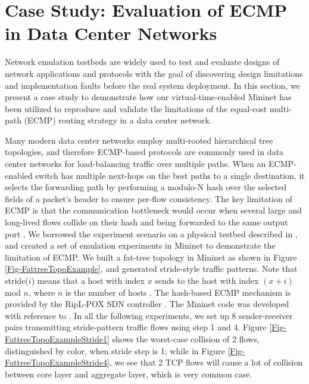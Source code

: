 \section{Case Study: Evaluation of ECMP in Data Center Networks}
\label{Sec-CaseStudy}
Network emulation testbeds are widely used to test and evaluate designs of network applications and protocols with the goal of discovering design limitations and implementation faults before the real system deployment. In this section, we present a case study to demonstrate how our virtual-time-enabled Mininet has been utilized to reproduce and validate the limitations of the equal-cost multi-path (ECMP) routing strategy in a data center network.

Many modern data center networks employ multi-rooted hierarchical tree topologies, and therefore ECMP-based protocols \cite{ECMP} are commonly used in data center networks for load-balancing traffic over multiple paths. When an ECMP-enabled switch has multiple next-hops on the best paths to a single destination, it selects the forwarding path by performing a modulo-N hash over the selected fields of a packet's header to ensure per-flow consistency. The key limitation of ECMP is that the communication bottleneck would occur when several large and long-lived flows collide on their hash and being forwarded to the same output port \cite{Hedera}. 
We borrowed the experiment scenario on a physical testbed described in \cite{Hedera}, and created a set of emulation experiments in Mininet to demonstrate the limitation of ECMP. We built a fat-tree topology in Mininet as shown in Figure \ref{Fig-FattreeTopoExample}, and generated stride-style traffic patterns. Note that stride($i$) means that a host with index $x$ sends to the host with index $(x + i)$ mod $n$, where $n$ is the number of hosts \cite{Hedera}. 
The hash-based ECMP mechanism is provided by the RipL-POX SDN controller \cite{RipLPox}. The Mininet code was developed with reference to \cite{ReproNetReserch}. In all the following experiments, we set up 8 sender-receiver pairs transmitting stride-pattern traffic flows using step 1 and 4. Figure \ref{Fig-FattreeTopoExampleStride1} shows the worst-case collision of 2 flows, distinguished by color, when stride step is 1; while in Figure \ref{Fig-FattreeTopoExampleStride4}, we see that 2 TCP flows will cause a lot of collision between core layer and aggregate layer, which is very common case.


\begin{figure*}[htbp]
\centering
{}
\caption{\textbf{A Data Center Network with a Degree-4 Fat Tree Topology}}
\label{Fig-FattreeTopoExample}
\end{figure*}

